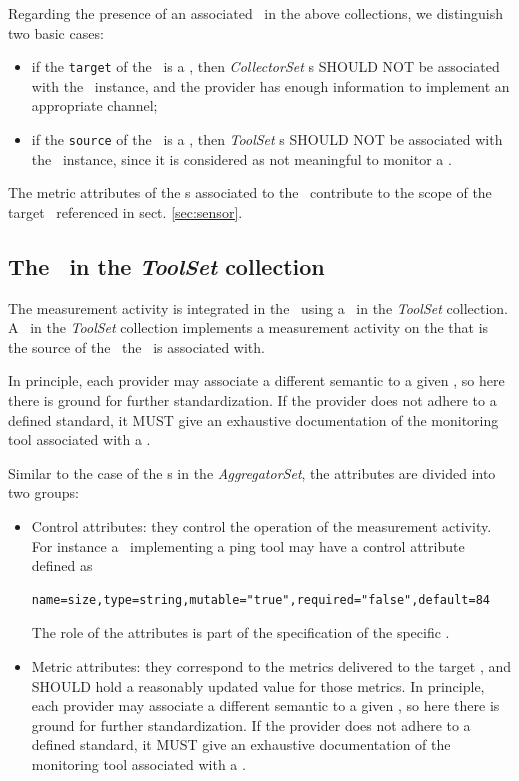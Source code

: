 \documentclass[12pt]{article}  %
\begin{document}
{Regarding the presence of an associated \mi\ in the above collections, we distinguish two basic cases:

\begin{itemize}

\item if the {\tt target} of the \coll\ is a \sens, then {\em CollectorSet} \mi s SHOULD NOT be associated with the \coll\ instance, and the provider has enough information to implement an appropriate channel;

\item if the {\tt source} of the \coll\ is a \sens, then {\em ToolSet} \mi s SHOULD NOT be associated with the \coll\ instance, since it is considered as not meaningful to monitor a \sens.

\end{itemize}

The metric attributes of the \mi s associated to the \coll\ contribute to the scope of the target \sens\ referenced in sect. \ref{sec:sensor}.

\subsection{The \mi\ in the {\em ToolSet} collection}

The measurement activity is integrated in the \coll\ using a \mi\ in the {\em ToolSet} collection. A \mi\ in the {\em ToolSet} collection implements a measurement activity on the \rs that is the source of the \sens\ the \mi\ is associated with.

In principle, each provider may associate a different semantic to a given \mi, so here there is ground for further standardization. If the provider does not adhere to a defined standard, it MUST give an exhaustive documentation of the monitoring tool associated with a \mi.

Similar to the case of the \mi s in the {\em AggregatorSet}, the attributes are divided into two groups:
\begin{itemize}
\item Control attributes: they control the operation of the measurement activity. For instance a \mi\ implementing a ping tool may have a control attribute defined as 
\begin{verbatim}
name=size,type=string,mutable="true",required="false",default=84
\end{verbatim}
The role of the attributes is part of the specification of the specific \mi.
\item Metric attributes: they correspond to the metrics delivered to the target \sens, and SHOULD hold a reasonably updated value for those metrics. In principle, each provider may associate a different semantic to a given \mi, so here there is ground for further standardization. If the provider does not adhere to a defined standard, it MUST give an exhaustive documentation of the monitoring tool associated with a \mi.
\end{itemize}

}
\end{document}
